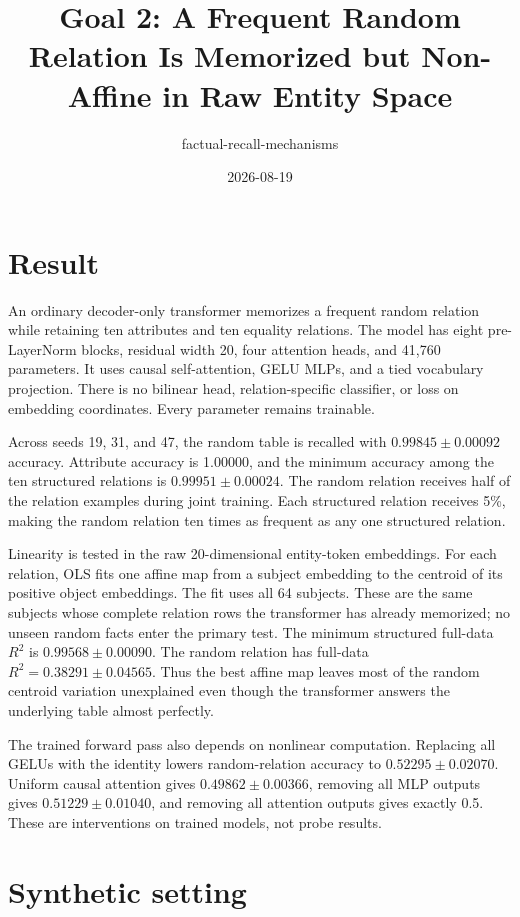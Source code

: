 \documentclass[11pt]{article}
\title{Goal 2: A Frequent Random Relation Is Memorized but Non-Affine in Raw Entity Space}
\author{factual-recall-mechanisms}
\date{2026-08-19}
\begin{document}
\maketitle

\section{Result}

An ordinary decoder-only transformer memorizes a frequent random relation while
retaining ten attributes and ten equality relations.  The model has eight
pre-LayerNorm blocks, residual width 20, four attention heads, and 41,760
parameters.  It uses causal self-attention, GELU MLPs, and a tied vocabulary
projection.  There is no bilinear head, relation-specific classifier, or loss
on embedding coordinates.  Every parameter remains trainable.

Across seeds 19, 31, and 47, the random table is recalled with
$0.99845\pm0.00092$ accuracy.  Attribute accuracy is 1.00000, and the minimum
accuracy among the ten structured relations is $0.99951\pm0.00024$.  The random
relation receives half of the relation examples during joint training.  Each
structured relation receives 5\%, making the random relation ten times as
frequent as any one structured relation.

Linearity is tested in the raw 20-dimensional entity-token embeddings.  For
each relation, OLS fits one affine map from a subject embedding to the centroid
of its positive object embeddings.  The fit uses all 64 subjects.  These are
the same subjects whose complete relation rows the transformer has already
memorized; no unseen random facts enter the primary test.  The minimum
structured full-data $R^2$ is $0.99568\pm0.00090$.  The random relation has
full-data $R^2=0.38291\pm0.04565$.  Thus the best affine map leaves most of the
random centroid variation unexplained even though the transformer answers the
underlying table almost perfectly.

The trained forward pass also depends on nonlinear computation.  Replacing all
GELUs with the identity lowers random-relation accuracy to
$0.52295\pm0.02070$.  Uniform causal attention gives
$0.49862\pm0.00366$, removing all MLP outputs gives
$0.51229\pm0.01040$, and removing all attention outputs gives exactly 0.5.
These are interventions on trained models, not probe results.

\section{Synthetic setting}
\end{document}
